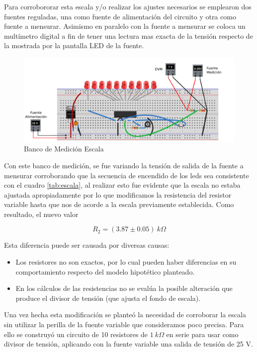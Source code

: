 \documentclass[12pt,a4paper]{article}
\begin{document}
			Para corrobororar esta escala y/o realizar los ajustes necesarios se emplearon dos fuentes reguladas, una como fuente de alimentación del circuito y otra como fuente a mensurar. Asimismo en paralelo con la fuente a mensurar se coloca un multímetro digital a fin de tener una lectura mas exacta de la tensión respecto de la mostrada por la pantalla LED de la fuente.

			\begin{figure}[H]
			\centering
				\includegraphics[scale=0.8]{images/banco1.pdf}\caption{Banco de Medición Escala}\label{fig:banco1}
			\end{figure}

			Con este banco de medición, se fue variando la tensión de salida de la fuente a mensurar corroborando que la secuencia de encendido de los leds sea consistente con el cuadro \ref{tab:escala}, al realizar esto fue evidente que la escala no estaba ajustada apropiadamente por lo que modificamos la resistencia del resistor variable hasta que nos de acorde a la escala previamente establecida. Como resultado, el nuevo valor

			\begin{equation}
				R_2 = (3.87 \pm 0.05) \: k \Omega
			\end{equation}

			Esta diferencia puede ser causada por diversas causas:
			\begin{itemize}
				\item Los resistores no son exactos, por lo cual pueden haber diferencias en su comportamiento respecto del modelo hipotético planteado.

				\item En los cálculos de las resistencias no se evalúa la posible alteración que produce el divisor de tensión (que ajusta el fondo de escala).
			\end{itemize}

			Una vez hecha esta modificación se planteó la necesidad de corroborar la escala sin utilizar la perilla de la fuente variable que consideramos poco precisa. Para ello se construyó un circuito de 10 resistores de $1 \: k\Omega$ en serie para usar como divisor de tensión, aplicando con la fuente variable una salida de tensión de 25 V.
\end{document}
